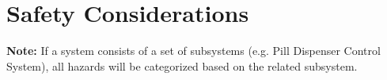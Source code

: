 \documentclass[12pt]{article}
\begin{document}

\section{Safety Considerations}

\noindent \textbf{Note:} If a system consists of a set of subsystems (e.g. Pill Dispenser Control System), all hazards will be categorized based on the related subsystem.
\end{document}
